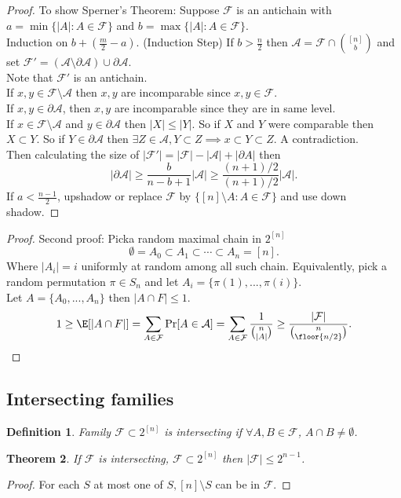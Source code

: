 \documentclass[a4paper]{article}
\newtheorem{thm}{Theorem}[section]
\newtheorem{defn}[thm]{Definition}
\begin{document}
\begin{proof}
    To show Sperner's Theorem: Suppose $\mathcal{F}$ is an antichain with $a=\min \{|A|:A\in \mathcal{F}\}$ and $b=\max \{|A|:A\in \mathcal{F}\}$. \\
    Induction on $b+(\frac{m}{2}-a)$. 
    (Induction Step) If $b>\frac{n}{2}$ then $\mathcal{A}=\mathcal{F}\cap {[n] \choose b}$ and set $\mathcal{F}'=(\mathcal{A}\setminus \partial \mathcal{A})\cup \partial \mathcal{A}$. \\
    Note that $\mathcal{F}'$ is an antichain. \\
    If $x,y\in \mathcal{F}\setminus \mathcal{A}$ then $x,y$ are incomparable since $x,y\in \mathcal{F}$.\\
    If $x,y\in \partial \mathcal{A}$, then $x,y$ are incomparable since they are in same level. \\
    If $x\in \mathcal{F}\setminus \mathcal{A}$ and $y\in \partial \mathcal{A}$ then $|X|\leq |Y|$. So if $X$ and $Y$ were comparable then $X\subset Y$. So if $Y\in \partial \mathcal{A}$ then $\exists Z\in \mathcal{A}, Y\subset Z\implies x\subset Y \subset Z$. A contradiction. \\
    Then calculating the size of $|\mathcal{F}'|=|\mathcal{F}|-|\mathcal{A}|+|\partial A|$ then 
    \[
    |\partial \mathcal{A}|\geq \frac{b}{n-b+1}|\mathcal{A}|\geq \frac{(n+1)/2}{(n+1)/2}|\mathcal{A}|
    .\] 
    If $a<\frac{n-1}{2}$, upshadow or replace $\mathcal{F}$ by $ \{[n]\setminus A: A\in \mathcal{F}\}$ and use down shadow. 
\end{proof}
\begin{proof}
    Second proof: Picka  random maximal chain in $2^{[n]}$ 
    \[
    \emptyset = A_0\subset A_1\subset \cdots \subset A_n= [n]
    .\] 
    Where $|A_i|=i$ uniformly at random among all such chain. Equivalently, pick a random permutation $\pi \in S_n$ and let $A_i= \{\pi(1),...,\pi(i)\}$. \\
    Let $A= \{A_0,...,A_n\}$ then $|A\cap F|\leq 1$. 
    \[
    1\geq \E[|A \cap F|]=\sum_{A\in \mathcal{F}}\Pr[A\in \mathcal{A}]=\sum_{A\in \mathcal{F}} \frac{1}{{n \choose |A|}}\geq \frac{|\mathcal{F}|}{{n \choose \floor{n/2}}}
    .\] 
\end{proof}

\subsection{Intersecting families}

\begin{defn}
    Family $\mathcal{F}\subset 2^{[n]}$ is intersecting if $\forall A,B\in \mathcal{F}$, $A\cap B\neq \emptyset$. 
\end{defn}
\begin{thm}
    If $\mathcal{F}$ is intersecting, $\mathcal{F}\subset 2^{[n]}$ then $|\mathcal{F}|\leq 2^{n-1}$. 
\end{thm}
\begin{proof}
    For each $S$ at most one of $S, [n]\setminus S$ can be in $\mathcal{F}$.
\end{proof}
\end{document}

